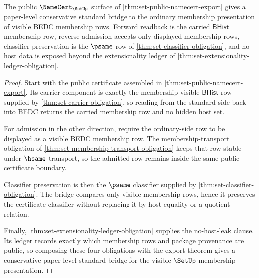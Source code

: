 \begin{theorem}
\label{thm:set-public-namecert-standard-bridge}
The public $\NameCert_{\SetUp}$ surface of \autoref{thm:set-public-namecert-export} gives a paper-level conservative standard bridge to the ordinary membership presentation of visible BEDC membership rows. Forward readback is the carried $\mathsf{BHist}$ membership row, reverse admission accepts only displayed membership rows, classifier preservation is the $\psame$ row of \autoref{thm:set-classifier-obligation}, and no host data is exposed beyond the extensionality ledger of \autoref{thm:set-extensionality-ledger-obligation}.
\end{theorem}
\begin{proof}
Start with the public certificate assembled in \autoref{thm:set-public-namecert-export}. Its carrier component is exactly the membership-visible $\mathsf{BHist}$ row supplied by \autoref{thm:set-carrier-obligation}, so reading from the standard side back into BEDC returns the carried membership row and no hidden host set.

For admission in the other direction, require the ordinary-side row to be displayed as a visible BEDC membership row. The membership-transport obligation of \autoref{thm:set-membership-transport-obligation} keeps that row stable under $\hsame$ transport, so the admitted row remains inside the same public certificate boundary.

Classifier preservation is then the $\psame$ classifier supplied by \autoref{thm:set-classifier-obligation}. The bridge compares only visible membership rows, hence it preserves the certificate classifier without replacing it by host equality or a quotient relation.

Finally, \autoref{thm:set-extensionality-ledger-obligation} supplies the no-host-leak clause. Its ledger records exactly which membership rows and package provenance are public, so composing these four obligations with the export theorem gives a conservative paper-level standard bridge for the visible $\SetUp$ membership presentation.
\end{proof}

